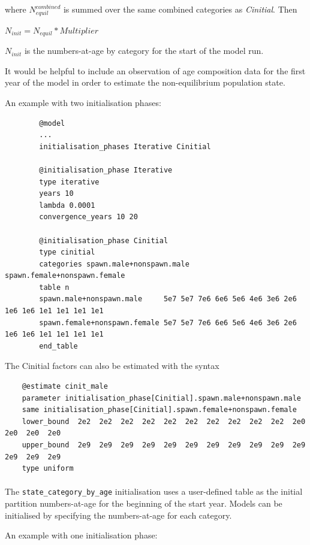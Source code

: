 where $N_{equil}^{combined} $ is summed over the same combined categories as \textit{Cinitial}. Then

$N_{init} =  N_{equil} * Multiplier $

$N_{init}$ is the numbers-at-age by category for the start of the model run.

It would be helpful to include an observation of age composition data for the first year of the model in order to estimate the non-equilibrium population state.

An example with two initialisation phases:

{\small{\begin{verbatim}
		@model
		...
		initialisation_phases Iterative Cinitial

		@initialisation_phase Iterative
		type iterative
		years 10
		lambda 0.0001
		convergence_years 10 20

		@initialisation_phase Cinitial
		type cinitial
		categories spawn.male+nonspawn.male spawn.female+nonspawn.female
		table n
		spawn.male+nonspawn.male     5e7 5e7 7e6 6e6 5e6 4e6 3e6 2e6 1e6 1e6 1e1 1e1 1e1 1e1
		spawn.female+nonspawn.female 5e7 5e7 7e6 6e6 5e6 4e6 3e6 2e6 1e6 1e6 1e1 1e1 1e1 1e1
		end_table
		\end{verbatim}}}

The Cinitial factors can also be estimated with the syntax

{\small{\begin{verbatim}
	@estimate cinit_male
	parameter initialisation_phase[Cinitial].spawn.male+nonspawn.male
	same initialisation_phase[Cinitial].spawn.female+nonspawn.female
	lower_bound  2e2  2e2  2e2  2e2  2e2  2e2  2e2  2e2  2e2  2e2  2e0  2e0  2e0  2e0
	upper_bound  2e9  2e9  2e9  2e9  2e9  2e9  2e9  2e9  2e9  2e9  2e9  2e9  2e9  2e9
	type uniform
	\end{verbatim}}}

\paragraph{}\label{sec:InitialisationPhase-StateCategoryByAge} 

The \texttt{state\_category\_by\_age} initialisation uses a user-defined table as the initial partition numbers-at-age for the beginning of the  start year. Models can be initialised by specifying the numbers-at-age for each category.

An example with one initialisation phase:

